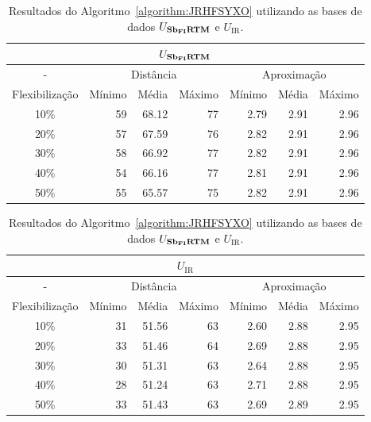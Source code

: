 \begin{table}[!htb]
  \caption{Resultados do Algoritmo~\ref{algorithm:JRHFSYXO} utilizando as bases de dados $U_{\textbf{Sb\textsubscript{FI}RTM}}{}$ e $U_{\text{IR}}$.}
  \label{table:NKDEXOVQ}
  \centering
  \begin{tabular}{|c|r|r|r|r|r|r|}
    \hline
    \multicolumn{7}{|c|}{$U_{\textbf{Sb\textsubscript{FI}RTM}}{}$}                                                                     \\ \hline
      -            & \multicolumn{3}{c|}{Distância}             & \multicolumn{3}{c|}{Aproximação}           \\ \hline
    Flexibilização & Mínimo       & Média        & Máximo       & Mínimo       & Média        & Máximo       \\ \hline  
    10\%           & 59           & 68.12        & 77           & 2.79         & 2.91         & 2.96         \\ \hline
    20\%           & 57           & 67.59        & 76           & 2.82         & 2.91         & 2.96         \\ \hline
    30\%           & 58           & 66.92        & 77           & 2.82         & 2.91         & 2.96         \\ \hline
    40\%           & 54           & 66.16        & 77           & 2.81         & 2.91         & 2.96         \\ \hline
    50\%           & 55           & 65.57        & 75           & 2.82         & 2.91         & 2.96         \\ \hline    
  \end{tabular}

  \vspace{5mm}

  \begin{tabular}{|c|r|r|r|r|r|r|}
    \hline
    \multicolumn{7}{|c|}{$U_{\text{IR}}$}                                                                    \\ \hline
      -            & \multicolumn{3}{c|}{Distância}             & \multicolumn{3}{c|}{Aproximação}           \\ \hline
    Flexibilização & Mínimo       & Média        & Máximo       & Mínimo       & Média        & Máximo       \\ \hline  
    10\%           & 31           & 51.56        & 63           & 2.60         & 2.88         & 2.95         \\ \hline
    20\%           & 33           & 51.46        & 64           & 2.69         & 2.88         & 2.95         \\ \hline
    30\%           & 30           & 51.31        & 63           & 2.64         & 2.88         & 2.95         \\ \hline
    40\%           & 28           & 51.24        & 63           & 2.71         & 2.88         & 2.95         \\ \hline
    50\%           & 33           & 51.43        & 63           & 2.69         & 2.89         & 2.95         \\ \hline    
  \end{tabular}
\end{table}


